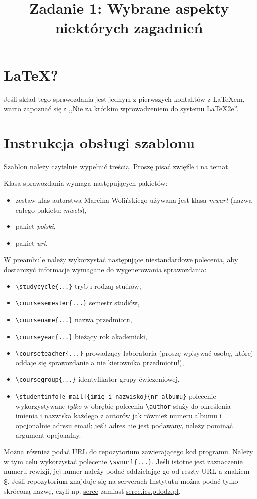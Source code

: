 \documentclass{classrep}
\author{%
  \studentinfo{Julian Brzechwa}{540282} \and
  \studentinfo{Jan Mickiewicz}{823941} \and
  \studentinfo{Adam Tuwim}{561004}
}
\title{Zadanie 1: Wybrane aspekty niektórych zagadnień}
\begin{document}
\maketitle

\section{\LaTeX?}

Jeśli skład tego sprawozdania jest jednym z pierwszych kontaktów z
\LaTeX\dywiz em, warto zapoznać się z ,,Nie za krótkim wprowadzeniem do
systemu \LaTeX2e''\cite{l2short}.

\section{Instrukcja obsługi szablonu}
Szablon należy czytelnie wypełnić treścią. Proszę pisać zwięźle i na temat.

Klasa sprawozdania wymaga następujących pakietów:
\begin{itemize}
  \item zestaw klas autorstwa Marcina Wolińskiego \ppauza używana jest klasa
    \emph{mwart} (nazwa całego pakietu: \emph{mwcls}),
  \item pakiet \emph{polski},
  \item pakiet \emph{url}.
\end{itemize}

W preambule należy wykorzystać następujące niestandardowe polecenia, aby
dostarczyć informacje wymagane do wygenerowania sprawozdania:
\begin{itemize}
  \item \verb+\studycycle{...}+ \ppauza tryb i rodzaj studiów,
  \item \verb+\coursesemester{...}+ \ppauza semestr studiów,
  \item \verb+\coursename{...}+ \ppauza nazwa przedmiotu,
  \item \verb+\courseyear{...}+ \ppauza bieżący rok akademicki,
  \item \verb+\courseteacher{...}+ \ppauza prowadzący laboratoria (proszę
    wpisywać osobę, której oddaje się sprawozdanie a nie kierownika
    przedmiotu!),
  \item \verb+\coursegroup{...}+ \ppauza identyfikator grupy ćwiczeniowej,
  \item \verb+\studentinfo[e-mail]{imię i nazwisko}{nr albumu}+ \ppauza
    polecenie wykorzystywane \emph{tylko} w obrębie polecenia \verb+\author+
    służy do określenia imienia i nazwiska każdego z autorów jak również
    numeru albumu i opcjonalnie adresu e\dywiz mail; jeśli adres nie jest
    podawany, należy pominąć argument opcjonalny.
\end{itemize}
Można również podać URL do repozytorium zawierającego kod programu. Należy w
tym celu wykorzystać polecenie \verb+\svnurl{...}+. Jeśli istotne jest
zaznaczenie numeru rewizji, jej numer należy podać oddzielając go od reszty
URL-a znakiem \verb+@+. Jeśli repozytorium znajduje się na serwerach Instytutu
można podać tylko skróconą nazwę, czyli np. \url{serce} zamiast
\url{serce.ics.p.lodz.pl}.
\end{document}
